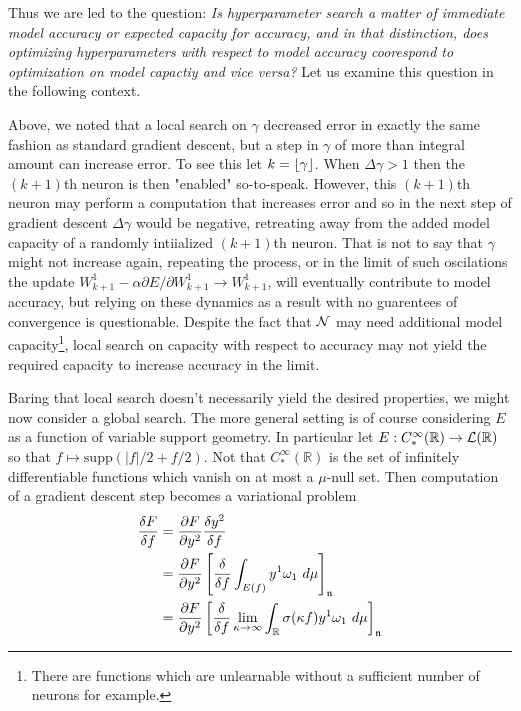 \documentclass[12pt]{article}
\begin{document}
\begin{itemize}
	Thus we are led to the question: \emph{Is hyperparameter search a matter of immediate model accuracy or expected capacity for accuracy, and in that distinction, does optimizing hyperparameters with respect to model accuracy coorespond to optimization on model capactiy and vice versa?}  Let us examine this question in the following context. \

	Above, we noted that a local search on $\gamma$ decreased error in exactly the same fashion as standard gradient descent, but a step in $\gamma$ of more than integral amount can increase error. To see this let $k = \floor*{\gamma}$. When $\Delta \gamma > 1$ then the $(k+1)$th neuron is then "enabled" so-to-speak. However, this $(k+1)$th neuron may perform a computation that increases error and so in the next step of gradient descent $\Delta \gamma$ would be negative, retreating away from the added model capacity of a randomly intiialized $(k+1)$th neuron. That is not to say that $\gamma$ might not increase again, repeating the process, or in the limit of such oscilations the update $ W^1_{k+1} -\alpha\partial E/\partial W^1_{k+1} \to W^1_{k+1}$, will eventually contribute to model accuracy, but relying on these dynamics as a result with no guarentees of convergence is questionable. Despite the fact that $\scriptn$ may need additional model capacity\footnote{There are functions which are unlearnable without a sufficient number of neurons for example.}, local search on capacity with respect to accuracy may not yield the required capacity to increase accuracy in the limit.


	Baring that local search doesn't necessarily yield the desired properties, we might now consider a global search.
	The more general setting is of course considering $E$ as a function of variable support geometry. In particular let $E: C^{\infty}_*(\mathbb{R}) \to \scriptl(\mathbb{R})$ so that $f \mapsto \text{supp}(|f|/2 + f/2).$ Not that $C^{\infty}_*(\mathbb{R})$ is the set of infinitely differentiable functions which vanish on at most a $\mu$-null set. Then computation of a gradient descent step becomes a variational problem
	\begin{equation*}
		\begin{aligned}
			\frac{\delta F}{\delta f} &= \frac{\partial F}{\partial y^2} \frac{\delta y^2}{\delta f}  \\
			&= \frac{\partial F}{\partial y^2} \left[\frac{\delta}{\delta f} \int_{E(f)} y^1 \omega_1\ d\mu \right]_{\mathfrak{n}} \\
			&= \frac{\partial F}{\partial y^2} \left[\frac{\delta}{\delta f} \lim_{\kappa \to \infty}\int_{\reals} {\sigma}(\kappa f) y^1 \omega_1\ d\mu \right]_{\mathfrak{n}}
		\end{aligned}
	\end{equation*}


\end{itemize}
\end{document}
